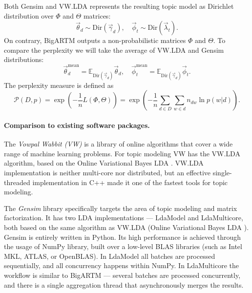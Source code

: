 \documentclass[russian]{llncs}
\begin{document}
Both Gensim and VW.LDA represents the resulting topic model as Dirichlet distribution over $\Phi$ and $\Theta$ matrices:
\[
	\vec{\theta}_{d} \sim \text{Dir}(\vec{\gamma}_d), \quad \vec{\phi}_{t} \sim \text{Dir}(\vec{\lambda}_t).
\]
On contrary, BigARTM outputs a non-probabilistic matrices $\Phi$ and $\Theta$.
To compare the perplexity we will take the average of VW.LDA and Gensim distributions:
\[
	\vec{\theta}^\text{mean}_d = \mathbb{E}_{\text{Dir}(\vec{\gamma}_d)}\vec{\theta}_d, \quad \vec{\phi}^\text{mean}_t = \mathbb{E}_{\text{Dir}(\vec{\gamma}_d)} \vec{\phi}_t.
\]
The perplexity measure is defined as
\begin{equation}
    \label{eq:perplexity}
    \mathscr{P}(D, p) = \exp\left(- \frac{1}{n} L(\Phi, \Theta) \right) = \exp \left( - \frac{1}{n} \sum_{d \in D} \sum_{w \in d} n_{dw} \ln p(w | d) \right).
\end{equation}

\paragraph{Comparison to existing software packages.}

The \emph{Vowpal Wabbit (VW)} is a library
of online algorithms that cover a wide range of machine learning problems. %
For topic modeling VW has the VW.LDA algorithm, based on the Online Variational Bayes LDA \cite{hoffman10online}.
VW.LDA implementation is neither multi-core nor distributed,
but an effective single-threaded implementation in C++ made it one of the fastest tools for topic modeling.%

The \emph{Gensim} library specifically targets the area of topic modeling and matrix factorization.
It has two LDA implementations --- LdaModel and LdaMulticore,
both based on the same algorithm as VW.LDA (Online Variational Bayes LDA \cite{hoffman10online}).
Gensim is entirely written in Python. Its high performance is achieved through the usage of NumPy library,
built over a low-level BLAS libraries (such as Intel MKL, ATLAS, or OpenBLAS).
In LdaModel all batches are processed sequentially, and all concurrency happens within NumPy. %
In LdaMulticore the workflow is similar to BigARTM --- several batches are processed concurrently, and there is a single aggregation thread that asynchronously merges the results.
\end{document}
